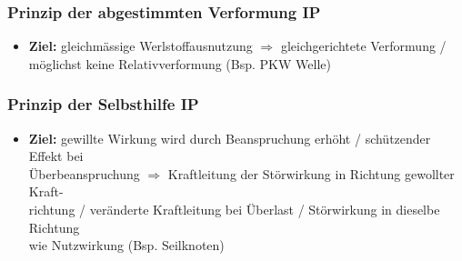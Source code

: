     \subsubsection{Prinzip der abgestimmten Verformung \hfill IP}
    \begin{scriptsize}
        \begin{itemize}
            \item \textbf{Ziel:} gleichmässige Werlstoffausnutzung $\Rightarrow$ gleichgerichtete Verformung / \\möglichst keine Relativverformung (Bsp. PKW Welle)
        \end{itemize}
    \end{scriptsize}

    \subsubsection{Prinzip der Selbsthilfe \hfill IP}
    \begin{scriptsize}
        \begin{itemize}
            \item \textbf{Ziel:} gewillte Wirkung wird durch Beanspruchung erhöht / schützender Effekt bei \\Überbeanspruchung $\Rightarrow$ Kraftleitung der Störwirkung in Richtung gewollter Kraft-\\richtung / veränderte Kraftleitung bei Überlast / Störwirkung in dieselbe Richtung \\wie Nutzwirkung (Bsp. Seilknoten) 
         \end{itemize}
    \end{scriptsize}
